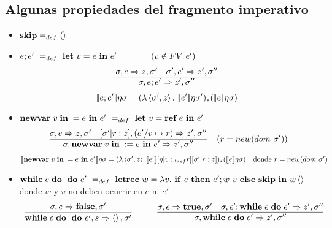   \subsection{Algunas propiedades del fragmento imperativo}
    \begin{itemize}
      \item $\textbf{skip} =_{def} \left\langle \right\rangle$
      \item $e;e'\ =_{def}\ \textbf{let}\ v=e \ \mathbf{in}\  e'\qquad\qquad(v\notin FV\ e')$
        \[\begin{array}{c}
          \underline{\sigma,e \Rightarrow z,\sigma'\quad \sigma',e' \Rightarrow z',\sigma''}\\
          \sigma, e;e' \Rightarrow z',\sigma''
          \end{array}
        \]
        \[
        \se{e;e'}\eta\s = (\lambda \la\s',z\ra.\ \se{e'}\eta\s')_*(\se{e}\eta\s)
        \]
      \item $\newvar v=e\ine e'\ =_{def}\ \textbf{let}\ v=\textbf{ref}\ e \ine e'$
        \[\begin{array}{c}
        \underline{\sigma,e \Rightarrow z,\sigma'\quad [\sigma'|r:z],(e'/v\mapsto r) \Rightarrow z',\sigma''}\\
        \sigma,\textbf{newvar}\;v\;\textbf{in}\;:=e\ \mathbf{in}\  e' \Rightarrow z',\sigma''
        \end{array}
        \ \ (r=new(dom\ \sigma'))
        \]
        \[
        [\![\textbf{newvar}\;v\;\textbf{in}\;=e\ \mathbf{in}\  e']\!]\eta\sigma = (\lambda \left\langle \sigma', z\right\rangle.[\![e']\!][\eta|v:\iota_{ref}r][\sigma'|r:z])_{*}([\![e]\!]\eta\sigma)\quad\text{donde } r = new(dom\  \sigma') 
        \]
      \item $\while e\doc e'\ =_{def}\ \textbf{letrec}\ w=\lambda v.\ \ife e\thene e'; w \ v \elsee \textbf{skip} \ine w \la \ra$
      \PN donde $w$ y $v$ no deben ocurrir en $e$ ni $e'$
      \[\begin{array}{c}
        \s,e \Rightarrow \textbf{false},\s'\\
        \overline{\while e\doc e',s \Rightarrow \la\ra,\s'}
        \end{array}
        \qquad
        \begin{array}{c}
        \underline{\s,e \Rightarrow \textbf{true},\s'\quad \s, e';\while e \do e' \Rightarrow z',\s''}\\
        \s, \while e \do e' \Rightarrow z',\s''
        \end{array}
        \]
    \end{itemize}